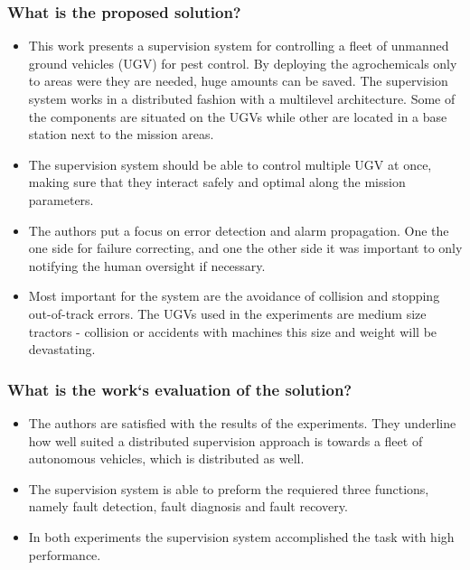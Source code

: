 \documentclass{article}
\begin{document}
\subsubsection*{What is the proposed solution?}
\begin{itemize}
    \item  This work presents a supervision system for controlling a fleet of unmanned ground vehicles (UGV) for pest control. By deploying the agrochemicals only to areas were they are needed, huge amounts can be saved. The supervision system works in a distributed fashion with a multilevel architecture. Some of the components are situated on the UGVs while other are located in a base station next to the mission areas.
    \item The supervision system should be able to control multiple UGV at once, making sure that they interact safely and optimal along the mission parameters.  
    \item The authors put a focus on error detection and alarm propagation. One the one side for failure correcting, and one the other side it was important to only notifying the human oversight if necessary. 
    \item Most important for the system are the avoidance of collision and stopping out-of-track errors. The UGVs used in the experiments are medium size tractors - collision or accidents with machines this size and weight will be devastating.
\end{itemize}
\subsubsection*{What is the work`s evaluation of the solution?}
\begin{itemize}
    \item The authors are satisfied with the results of the experiments. They underline how well suited a distributed supervision approach is towards a fleet of autonomous vehicles, which is distributed as well.
    \item The supervision system is able to preform the requiered three functions, namely fault detection, fault diagnosis and fault recovery.
    \item In both experiments the supervision system accomplished the task with high performance.
\end{itemize}
\end{document}
